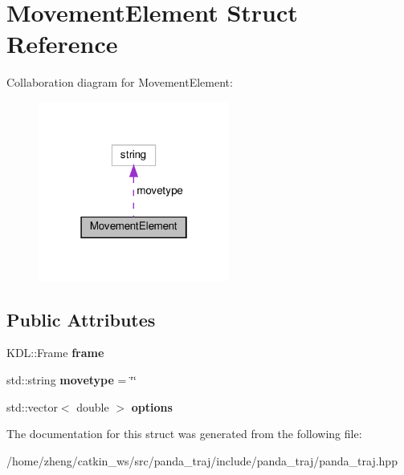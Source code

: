\hypertarget{struct_movement_element}{}\section{Movement\+Element Struct Reference}
\label{struct_movement_element}


Collaboration diagram for Movement\+Element\+:
\nopagebreak
\begin{figure}[H]
\begin{center}
\leavevmode
\includegraphics[width=178pt]{struct_movement_element__coll__graph}
\end{center}
\end{figure}
\subsection*{Public Attributes}
\begin{DoxyCompactItemize}
\item 
\mbox{\label{struct_movement_element_a44003a39aa76f8f1037816d11d6e06be}} 
K\+D\+L\+::\+Frame {\bfseries frame}
\item 
\mbox{\label{struct_movement_element_ac79d7767025253e20886a44faccc43b2}} 
std\+::string {\bfseries movetype} = \char`\"{}\char`\"{}
\item 
\mbox{\label{struct_movement_element_a57b9bf9f0e9a4b1a03276370cafa1b01}} 
std\+::vector$<$ double $>$ {\bfseries options}
\end{DoxyCompactItemize}


The documentation for this struct was generated from the following file\+:\begin{DoxyCompactItemize}
\item 
/home/zheng/catkin\+\_\+ws/src/panda\+\_\+traj/include/panda\+\_\+traj/panda\+\_\+traj.\+hpp\end{DoxyCompactItemize}
